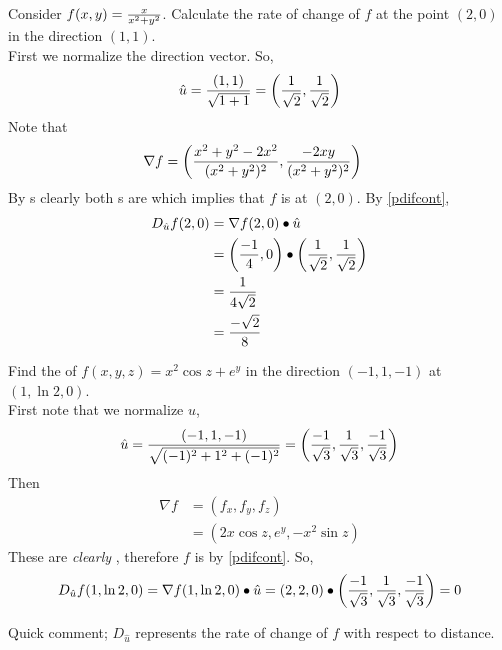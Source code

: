 \documentclass[english, 11pt]{article}
\begin{document}
\begin{exmp} Consider $f(x,y) = \frac{x}{x^2 + y^2}$. Calculate the rate of change of $f$ at the point $(2,0)$ in the direction $(1,1)$. \\

First we normalize the direction vector. So,
\[ \hat{u} = \frac{(1,1)}{\sqrt{1 + 1}} = \left( \frac{1}{\sqrt{2}},\frac{1}{\sqrt{2}} \right) \]
Note that
\begin{align*}
  \nabla f & = \left( \frac{x^2 + y^2 - 2x^2}{(x^2 + y^2)^2} , \frac{-2xy}{(x^2+y^2)^2} \right)
\end{align*}
By s clearly both s are  which implies that $f$ is  at $(2,0)$. By \autoref{pdifcont},
\begin{align*}
  D_{\hat{u}}f(2,0) & = \nabla f(2,0) \bullet \hat{u} \\
  & = \left( \frac{-1}{4},0 \right)\bullet \left( \frac{1}{\sqrt{2}}, \frac{1}{\sqrt 2} \right) \\
  & = \frac{1}{4\sqrt{2}} \\
  & = \frac{-\sqrt{2}}{8}
\end{align*}
\end{exmp}

\begin{exmp}
  Find the  of $f(x,y,z) = x^2 \cos z + e^y$ in the direction $(-1,1,-1)$ at $(1, \ln 2, 0)$. \\

  First note that we normalize $\hat{u}$,
  \[ \hat{u} = \frac{(-1,1,-1)}{\sqrt{(-1)^2 + 1^2 + (-1)^2}} = \left( \frac{-1}{\sqrt{3}}, \frac{1}{\sqrt{3}}, \frac{-1}{\sqrt{3}} \right) \]
  Then
  \begin{align*}
    \nabla f & = (f_x, f_y, f_z) \\
    & = (2x\cos z, e^y, -x^2 \sin z)
  \end{align*}
  These are \textit{clearly} , therefore $f$ is  by \autoref{pdifcont}.
  So,
  \begin{align*}
    D_{\hat{u}}f(1,\ln 2, 0) = \nabla f(1, \ln 2, 0) \bullet \hat{u} = (2,2,0) \bullet \left( \frac{-1}{\sqrt{3}}, \frac{1}{\sqrt{3}}, \frac{-1}{\sqrt{3}} \right) = 0
  \end{align*}
\end{exmp}

Quick comment; $D_{\hat{u}}$ represents the rate of change of $f$ with respect to distance.
\end{document}
